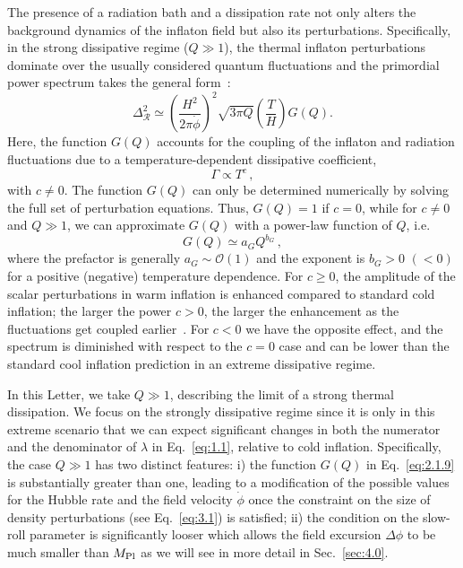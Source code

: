 \documentclass[aps,prd,twocolumn,amssymb,amsmath,floatfix,nofootinbib,superscriptaddress,preprintnumbers]{revtex4-1}
\begin{document}
The presence of a radiation bath and a dissipation rate not only alters the background dynamics of the inflaton field but also its perturbations. Specifically, in the strong dissipative regime ($Q\gg1$), the thermal inflaton perturbations dominate over the usually considered quantum 
fluctuations and the primordial power spectrum takes the general form~\cite{Hall:2003zp,Bastero-Gil:2011rva,Graham:2009bf,Ramos:2013nsa}:
\begin{equation}
    \Delta_{\mathcal{R}}^{2}\simeq\left(\frac{H^{2}}{2 \pi \dot{\phi}}\right)^{2}\sqrt{3\pi Q} \left(\frac{T}{H}\right) G(Q).
    \label{eq:2.1.9}
\end{equation}
Here, the function $G(Q)$ accounts for the coupling of the inflaton and radiation fluctuations due to a temperature-dependent dissipative coefficient, 
\begin{equation}
    \Gamma\propto T^c\,,
\end{equation}
with $c\neq0$. The function $G(Q)$ can only be determined numerically by solving the full set of perturbation equations. Thus, $G(Q)=1$ if $c=0$, while for $c\neq0$ and $Q\gg1$, we can approximate $G(Q)$ with a power-law function of $Q$, i.e. 
\begin{equation}
G(Q)\simeq a_G Q^{b_G} \, ,
\end{equation}
where the prefactor is generally $a_G\sim \mathcal{O}(1)$ and the exponent is $b_G>0$ $(<0)$ for a positive (negative) temperature dependence. For $c\geq 0$, the amplitude of the scalar perturbations in warm inflation is enhanced compared to standard cold inflation; the larger the power $c>0$, the larger the enhancement as the fluctuations get coupled earlier~\cite{Bastero-Gil:2011rva}. For $c<0$ we have the opposite effect, and
the spectrum is diminished with respect to the $c=0$ case and can be lower than the standard cool inflation prediction in an extreme dissipative regime.

In this Letter, we take $Q \gg 1$, describing the limit of a strong thermal dissipation. We focus on the strongly dissipative regime since it is only in this extreme scenario that we can expect significant changes in both the numerator and the denominator of $\lambda$ in Eq.~\ref{eq:1.1}, relative to cold inflation. Specifically, the case $Q\gg 1$ has two distinct features: i) the function $G(Q)$ in Eq.~\ref{eq:2.1.9} is substantially greater than one, leading to a modification of the possible values for the Hubble rate and the field velocity $\dot\phi$ once the constraint on the size of density perturbations (see Eq.~\ref{eq:3.1}) is satisfied; ii) the condition on the slow-roll parameter is significantly looser which allows the field excursion $\Delta \phi$ to be much smaller than $M_{\rm Pl}$ as we will see in more detail in Sec.~\ref{sec:4.0}.
\end{document}
